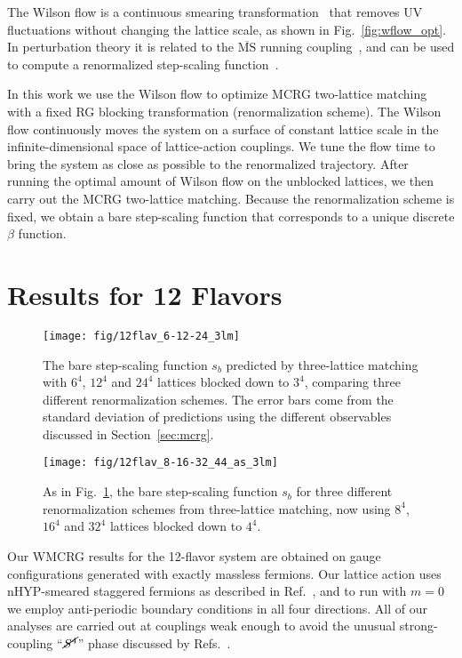 \documentclass{PoS}
\newcommand{\be}{\ensuremath{\beta} }
\newcommand{\Sb}{\ensuremath{\cancel{S^4}} }
\newcommand{\MSbar}{\ensuremath{\overline{\textrm{MS}} } }
\newcommand{\fig}[1]{Fig.~\ref{#1}}
\newcommand{\refcite}[1]{Ref.~\cite{#1}}
\newcommand{\secref}[1]{Section~\ref{#1}}
\begin{document}
The Wilson flow is a continuous smearing transformation~\cite{Narayanan:2006rf} that removes UV fluctuations without changing the lattice scale, as shown in \fig{fig:wflow_opt}.
In perturbation theory it is related to the \MSbar running coupling~\cite{Luscher:2010iy}, and can be used to compute a renormalized step-scaling function~\cite{Fodor:2012td, Fodor:2012qh}.

In this work we use the Wilson flow to optimize MCRG two-lattice matching with a fixed RG blocking transformation (renormalization scheme).
The Wilson flow continuously moves the system on a surface of constant lattice scale in the infinite-dimensional space of lattice-action couplings.
We tune the flow time to bring the system as close as possible to the renormalized trajectory.
After running the optimal amount of Wilson flow on the unblocked lattices, we then carry out the MCRG two-lattice matching.
Because the renormalization scheme is fixed, we obtain a bare step-scaling function that corresponds to a unique discrete \be function.



\section{\label{sec:results}Results for 12 Flavors} %
\begin{figure}[ht]
  \centering
  \texttt{[image: fig/12flav\_6-12-24\_3lm]}
  \caption{The bare step-scaling function $s_b$ predicted by three-lattice matching with $6^4$, $12^4$ and $24^4$ lattices blocked down to $3^4$, comparing three different renormalization schemes.  The error bars come from the standard deviation of predictions using the different observables discussed in \protect\secref{sec:mcrg}.}
  \label{fig:24to3}
\end{figure}

\begin{figure}[ht]
  \centering
  \texttt{[image: fig/12flav\_8-16-32\_44\_as\_3lm]}
  \caption{As in \protect\fig{fig:24to3}, the bare step-scaling function $s_b$ for three different renormalization schemes from three-lattice matching, now using $8^4$, $16^4$ and $32^4$ lattices blocked down to $4^4$.}
  \label{fig:32to4}
\end{figure}

Our WMCRG results for the 12-flavor system are obtained on gauge configurations generated with exactly massless fermions.
Our lattice action uses nHYP-smeared staggered fermions as described in \refcite{Cheng:2011ic}, and to run with $m = 0$ we employ anti-periodic boundary conditions in all four directions.
All of our analyses are carried out at couplings weak enough to avoid the unusual strong-coupling ``$\Sb$'' phase discussed by Refs.~\cite{Cheng:2011ic, Hasenfratz:2013uha}.
\end{document}
